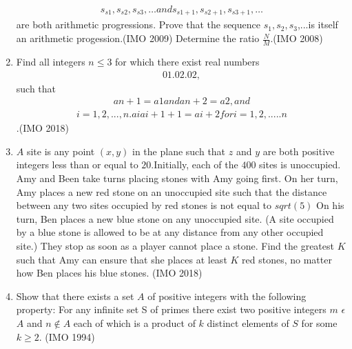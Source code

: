 \begin{enumerate}
		\begin{align}
			s_{s1}, s_{s2}, s_{s3},\dots and s_{s1+1}, s_{s2+1}, s_{s3+1},\dots
       \end{align}
are both arithmetic progressions. Prove that the sequence $s_1,s_2,s_3$,...is itself an arithmetic progession.\hfill(IMO 2009) Determine the ratio $\frac{N}{M}$.\hfill(IMO 2008)
\item Find all integers $n\leq3$ for which there exist real numbers \begin{align}01.02.02,\end{align} such that \begin{align} an+1=a1   and  an+2=a2,and \end{align} \begin{align}i=1,2,...,n. aiai+1+1=ai+2 for i=1,2,.....n\end{align}.\hfill (IMO 2018)
\item $A$ site is any point $(x,y)$ in the plane such that $z$ and $y$ are both positive integers less than or equal to $20$.Initially, each of the $400$ sites is unoccupied. Amy and Been take turns placing stones with Amy going first. On her turn, Amy places a new red stone on an unoccupied site such that the distance between any two sites occupied by red stones is not equal to $sqrt(5)$ On his turn, Ben places a new blue stone on any unoccupied site.
	(A site occupied by a blue stone is allowed to be at any distance from any other occupied site.) They stop as soon as a player cannot place a stone. Find the greatest $K$ such that Amy can  ensure that she places at least $K$ red stones, no matter how Ben places his blue stones. \hfill (IMO 2018)
	\item Show that there exists a set $A$ of positive  integers with the following property: For any infinite set {S} of primes there exist two positive integers $m$ $\epsilon$ $A$ and $n \notin A$ each of which is a product of $k$ distinct elements of $S$ for some $k \geq 2$.   \hfill(IMO 1994)
\end{enumerate}

